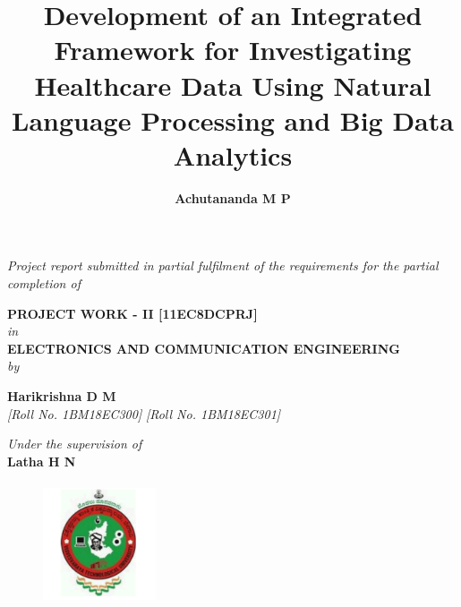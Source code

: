 \title{\fontsize{16pt}{19.2pt}\selectfont\bf{Development of an Integrated Framework for Investigating Healthcare Data Using Natural Language Processing and Big Data Analytics}}
\maketitle
\thispagestyle{empty}

\begin{center}
\vspace*{-8mm}
\textit{Project report submitted in partial fulfilment of the requirements for the partial completion of}

\vspace*{6mm}

{\fontsize{14pt}{16.8pt}\selectfont\textbf{PROJECT WORK - II [11EC8DCPRJ]}} \\ \vspace*{3mm}
{\fontsize{14pt}{16.8pt}\selectfont\textit{in}} \\
\vspace*{3mm}
%
{\fontsize{14pt}{16.8pt}\selectfont\textbf{ELECTRONICS AND COMMUNICATION ENGINEERING}} \\

\vspace*{2mm}
{\fontsize{14pt}{16.8pt}\selectfont\textit{by}} \\
\vspace*{3mm}

\author{\fontsize{14pt}{16.8pt}\selectfont\textbf{Achutananda M P}}  \hspace*{12mm} {\fontsize{14pt}{16.8pt}\selectfont\textbf{Harikrishna D M}}\\
\vspace*{2mm}
{\fontsize{12pt}{14.4pt}\selectfont\textit{[Roll No. 1BM18EC300]} \hspace*{12mm} \selectfont\textit{[Roll No. 1BM18EC301]} } \\



\vspace*{3mm}

\vspace*{4mm}\fontsize{14pt}{16.8pt}\selectfont\textit{Under the supervision of} \\
\vspace*{2mm}\fontsize{14pt}{16.8pt}\selectfont\textbf{Latha H N} \\
\vspace*{8mm}

\begin{figure}[!ht]
\centering
\includegraphics[height=36.068mm,width=33.274mm]{VTU_Logo}
\end{figure}
\vspace*{3mm}


\end{center}

